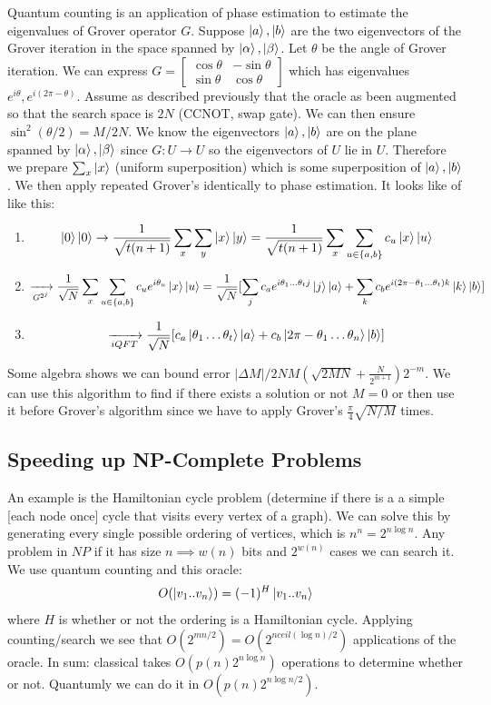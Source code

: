 \documentclass{article}
\begin{document}
Quantum counting is an application of phase estimation to estimate the eigenvalues of Grover operator $G$. Suppose $\ket{a},\ket{b}$ are the two eigenvectors of the Grover iteration in the space spanned by $\ket{\alpha}, \ket{\beta}$. Let $\theta$ be the angle of Grover iteration. We can express $G = \begin{bmatrix} \cos \theta & - \sin \theta \\ \sin \theta & \cos \theta \end{bmatrix}$ which has eigenvalues $e^{i\theta}, e^{i(2\pi - \theta)}$. Assume as described previously that the oracle as been augmented so that the search space is $2N$ (CCNOT, swap gate). We can then ensure $\sin^2(\theta/2) = M/2N$. We know the eigenvectors $\ket{a},\ket{b}$ are on the plane spanned by $\ket{\alpha}, \ket{\beta}$ since $G: U \to U$ so the eigenvectors of $U$ lie in $U$. Therefore we prepare $\sum_x \ket{x}$ (uniform superposition) which is some superposition of $\ket{a}, \ket{b}$. We then apply repeated Grover's identically to phase estimation. 
It looks like of like this:
\begin{enumerate}
\item $$\ket{0}\ket{0} \to \frac{1}{\sqrt{t(n+1)}}\sum_x \sum_y \ket{x} \ket{y} = \frac{1}{\sqrt{t(n+1)}} \sum_x \sum_{u \in \{a,b\}} c_u \ket{x} \ket{u}$$
\item $$\xrightarrow[G^{2^j}]{} \frac{1}{\sqrt{N}} \sum_x \sum_{u \in \{a,b\}} c_u e^{i \theta_u }\ket{x} \ket{u} = \frac{1}{\sqrt{N}}[\sum_j c_a e^{i\theta_1\dots \theta_t j}\ket{j}\ket{a} + \sum_k c_b e^{i(2\pi - \theta_1\dots \theta_t) k} \ket{k}\ket{b}]$$
\item $$\xrightarrow[iQFT]{} \frac{1}{\sqrt{N}} [c_a\ket{\theta_1 \dots \theta_t} \ket{a} + c_b \ket{2\pi - \theta_1 \dots \theta_n}\ket{b}] $$\end{enumerate}
	Some algebra shows we can bound error $|\Delta M|/2N M (\sqrt{2M N } + \frac{N}{2^{m+1}})2^{-m}$.
	We can use this algorithm to find if there exists a solution or not $M=0$ or then use it before Grover's algorithm since we have to apply Grover's $\frac{\pi}{4}\sqrt{N/M}$ times.
\subsection{Speeding up NP-Complete Problems}
An example is the Hamiltonian cycle problem (determine if there is a a simple [each node once] cycle that visits every vertex of a graph). We can solve this by generating every single possible ordering of vertices, which is $n^n = 2^{n \log n}$. Any problem in $NP$ if it has size $n \implies w(n)$ bits and $2^{w(n)}$ cases we can search it. We use quantum counting and this oracle:
$$O(\ket{v_1..v_n}) = (-1)^{H}\ket{v_1..v_n}$$
where $H$ is whether or not the ordering is a Hamiltonian cycle. Applying counting/search we see that $O(2^{mn/2}) = O(2^{n ceil(\log n)/2})$ applications of the oracle. In sum: classical takes $O(p(n) 2^{n \log n})$ operations to determine whether or not. Quantumly we can do it in $O(p(n) 2^{n\log n /2})$.
\end{document}
